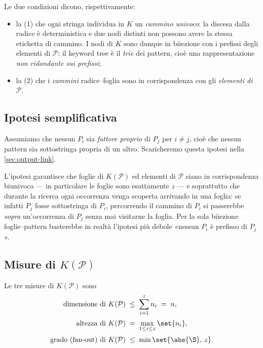 \begin{osservazione}
Le due condizioni dicono, rispettivamente:
\begin{itemize}
  \item la (1) che ogni stringa individua in $K$ un \emph{cammino univoco}: la discesa dalla
        radice è deterministica e due nodi distinti non possono avere la stessa etichetta di
        cammino. I nodi di $K$ sono dunque in biiezione con i prefissi degli elementi di
        $\mathcal{P}$: il keyword tree è il \emph{trie} dei pattern, cioè una
        rappresentazione \emph{non ridondante sui prefissi};
  \item la (2) che i \emph{cammini} radice--foglia sono in corrispondenza con gli
        \emph{elementi di $\mathcal{P}$}.
\end{itemize}
\end{osservazione}

\subsection{Ipotesi semplificativa}

Assumiamo che nessun $P_i$ sia \emph{fattore proprio} di $P_j$ per $i \neq j$, cioè che
nessun pattern sia sottostringa propria di un altro. Scaricheremo questa ipotesi nella
\autoref{sec:output-link}.

\begin{osservazione}
L'ipotesi garantisce che foglie di $K(\mathcal{P})$ ed elementi di $\mathcal{P}$ siano in
corrispondenza biunivoca --- in particolare le foglie sono esattamente $z$ --- e soprattutto
che durante la ricerca ogni occorrenza venga scoperta arrivando in una foglia: se infatti
$P_j$ fosse sottostringa di $P_i$, percorrendo il cammino di $P_i$ si passerebbe
\emph{sopra} un'occorrenza di $P_j$ senza mai visitarne la foglia. Per la sola biiezione
foglie--pattern basterebbe in realtà l'ipotesi più debole «nessun $P_i$ è prefisso di
$P_j$».
\end{osservazione}

\subsection{Misure di \texorpdfstring{$K(\mathcal{P})$}{K(P)}}

Le tre misure di $K(\mathcal{P})$ sono
\[
\begin{aligned}
  \text{dimensione di } K(\mathcal{P}) \;&\le\; \sum_{i=1}^{z} n_i \;=\; n, \\[2pt]
  \text{altezza di } K(\mathcal{P}) \;&=\; \max_{1 \le i \le z} \set{n_i}, \\[2pt]
  \text{grado (fan-out) di } K(\mathcal{P}) \;&\le\; \min\set{\abs{\S},\, z}.
\end{aligned}
\]

